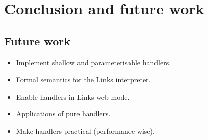 \chapter{Conclusion and future work}
\section{Future work}
\begin{itemize}
  \item Implement shallow and parameterisable handlers.
  \item Formal semantics for the Links interpreter.
  \item Enable handlers in Links web-mode.
  \item Applications of pure handlers.
  \item Make handlers practical (performance-wise).
\end{itemize}